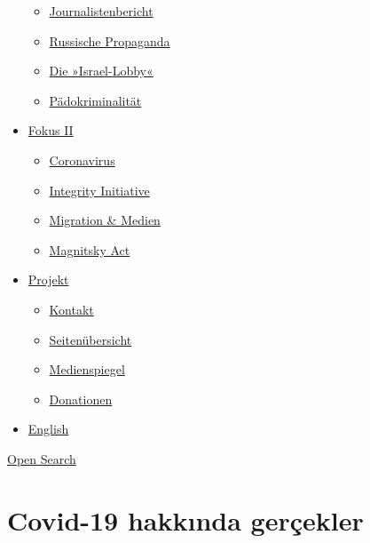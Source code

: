 \begin{itemize}
  \begin{itemize}
  \tightlist
  \item
    \href{https://swprs.org/bericht-eines-journalisten/}{Journalistenbericht}
  \item
    \href{https://swprs.org/russische-propaganda/}{Russische Propaganda}
  \item
    \href{https://swprs.org/die-israel-lobby-fakten-und-mythen/}{Die
    »Israel-Lobby«}
  \item
    \href{https://swprs.org/geopolitik-und-paedokriminalitaet/}{Pädokriminalität}
  \end{itemize}
\item
  \href{https://swprs.org/migration-und-medien/}{Fokus II}

  \begin{itemize}
  \tightlist
  \item
    \href{https://swprs.org/covid-19-hinweis-ii/}{Coronavirus}
  \item
    \href{https://swprs.org/die-integrity-initiative/}{Integrity
    Initiative}
  \item
    \href{https://swprs.org/migration-und-medien/}{Migration \& Medien}
  \item
    \href{https://swprs.org/der-fall-magnitsky/}{Magnitsky Act}
  \end{itemize}
\item
  \href{https://swprs.org/kontakt/}{Projekt}

  \begin{itemize}
  \tightlist
  \item
    \href{https://swprs.org/kontakt/}{Kontakt}
  \item
    \href{https://swprs.org/uebersicht/}{Seitenübersicht}
  \item
    \href{https://swprs.org/medienspiegel/}{Medienspiegel}
  \item
    \href{https://swprs.org/donationen/}{Donationen}
  \end{itemize}
\item
  \href{https://swprs.org/contact/}{English}
\end{itemize}

\protect\hyperlink{}{Open Search}

\hypertarget{covid-19-hakkux131nda-geruxe7ekler}{%
\section{Covid-19 hakkında
gerçekler}\label{covid-19-hakkux131nda-geruxe7ekler}}


